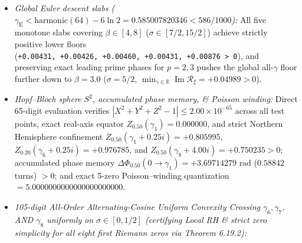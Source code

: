 \documentclass[
  11pt,
]{article}
\providecommand{\tightlist}{%
  \setlength{\itemsep}{0pt}\setlength{\parskip}{0pt}}
\begin{document}
\begin{enumerate}
  \begin{itemize}
  \tightlist
  \item
    \emph{Global Euler descent slabs
    (\(\gamma_{\text{E}} < \text{harmonic}(64) - 6\ln 2 = 0.585007820346 < 586/1000\)):}
    All five monotone slabs covering \(\beta \in [4, 8]\)
    (\(\sigma \in [7/2, 15/2]\)) achieve strictly positive lower floors
    (\texttt{+0.00431,\ +0.00426,\ +0.00460,\ +0.00431,\ +0.00876\ \textgreater{}\ 0}),
    and preserving exact leading prime phases for \(p = 2, 3\) pushes
    the global all-\(\gamma\) floor further down to \(\beta = 3.0\)
    (\(\sigma = 5/2\),
    \(\min_{\gamma \in \mathbb{R}}\operatorname{Im}\mathcal{R}_\xi = +0.04989 > 0\)).
  \item
    \emph{Hopf--Bloch sphere \(S^2\), accumulated phase memory, \&
    Poisson winding:} Direct 65-digit evaluation verifies
    \(|X^2 + Y^2 + Z^2 - 1| \le 2.00 \times 10^{-65}\) across all test
    points, exact real-axis equator \(Z_{0.50}(\gamma_1) = 0.000000\),
    and strict Northern Hemisphere confinement
    \(Z_{0.50}(\gamma_1 + 0.25i) = +0.805995\),
    \(Z_{0.20}(\gamma_6 + 0.25i) = +0.976785\), and
    \(Z_{0.50}(\gamma_8 + 4.00i) = +0.750235 > 0\); accumulated phase
    memory
    \(\Delta\Phi_{0.50}(0 \to \gamma_1) = +3.69714279\text{ rad}\)
    (\(0.58842\) turns) \(> 0\); and exact 5-zero Poisson--winding
    quantization \(= 5.0000000000000000000000\).
  \item
    \emph{105-digit All-Order Alternating-Cosine Uniform Convexity
    Crossing \(\gamma_6, \gamma_7\), AND \(\gamma_8\) uniformly on
    \(\sigma \in [0, 1/2]\) (certifying Local RH \& strict zero
    simplicity for all eight first Riemann zeros via Theorem 6.19.2):}
  \end{itemize}


\end{enumerate}
\end{document}
